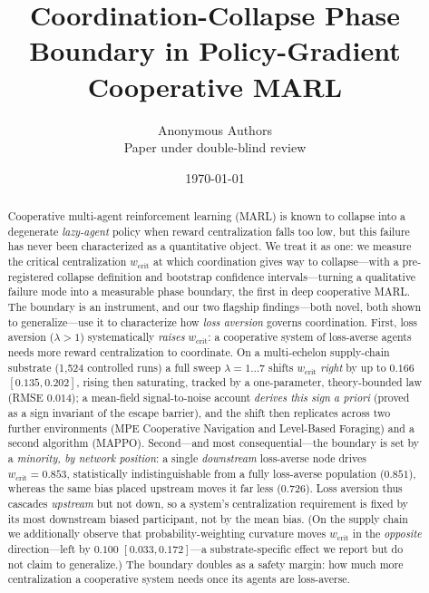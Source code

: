 \documentclass[letterpaper]{article}
\title{\textbf{Coordination-Collapse Phase Boundary in Policy-Gradient Cooperative MARL}}
\author{Anonymous Authors\\ Paper under double-blind review}
\date{\today}
\theoremstyle{plain}
\newcommand{\wcrit}{w_{\mathrm{crit}}}
\begin{document}
\maketitle

\begin{abstract}
Cooperative multi-agent reinforcement learning (MARL) is known to collapse
into a degenerate \emph{lazy-agent} policy when reward centralization falls
too low, but this failure has never been characterized as a quantitative
object. We treat it as one: we measure the critical centralization $\wcrit$
at which coordination gives way to collapse---with a pre-registered collapse
definition and bootstrap confidence intervals---turning a qualitative failure
mode into a measurable phase boundary, the first in deep cooperative MARL.
The boundary is an instrument, and our two flagship findings---both novel,
both shown to generalize---use it to characterize how \emph{loss aversion}
governs coordination. First, loss aversion ($\lambda>1$) systematically
\emph{raises} $\wcrit$: a cooperative system of loss-averse agents needs more
reward centralization to coordinate. On a multi-echelon supply-chain substrate
(1{,}524 controlled runs) a full sweep $\lambda{=}1{\ldots}7$ shifts $\wcrit$
\emph{right} by up to $0.166$ $[0.135, 0.202]$, rising then saturating, tracked
by a one-parameter, theory-bounded law (RMSE $0.014$); a mean-field
signal-to-noise account \emph{derives this sign a priori} (proved as a sign
invariant of the escape barrier), and the shift then replicates across two
further environments (MPE Cooperative Navigation and Level-Based Foraging) and
a second algorithm (MAPPO). Second---and most consequential---the boundary is
set by a \emph{minority, by network position}: a single \emph{downstream}
loss-averse node drives $\wcrit = 0.853$, statistically indistinguishable from a
fully loss-averse population ($0.851$), whereas the same bias placed upstream
moves it far less ($0.726$). Loss aversion thus cascades \emph{upstream} but not
down, so a system's centralization requirement is fixed by its most downstream
biased participant, not by the mean bias. (On the supply chain we additionally
observe that probability-weighting curvature moves $\wcrit$ in the
\emph{opposite} direction---left by $0.100$ $[0.033, 0.172]$---a substrate-specific
effect we report but do not claim to generalize.) The boundary doubles as a
safety margin: how much more centralization a cooperative system needs once
its agents are loss-averse.
\end{abstract}
\end{document}
